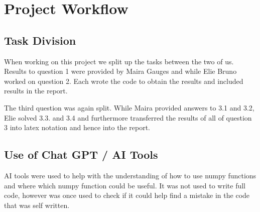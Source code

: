 
\section{Project Workflow}
\subsection{Task Division}

When working on this project we split up the tasks between the two of us. Results to question 1 were provided by Maira Gauges and while Elie Bruno worked on question 2. Each wrote the code to obtain the results and included results in the report. 

The third question was again split. While Maira provided answers to 3.1 and 3.2, Elie solved 3.3. and 3.4 and furthermore transferred the results of all of question 3 into latex notation and hence into the report. 


\subsection{Use of Chat GPT / AI Tools}
AI tools were used to help with the understanding of how to use numpy functions and where which numpy function could be useful. It was not used to write full code, however was once used to check if it could help find a mistake in the code that was self written. 




